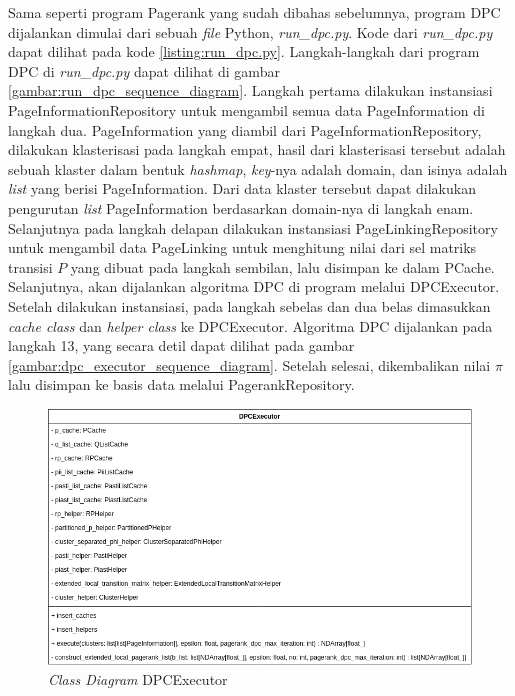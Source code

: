 Sama seperti program Pagerank yang sudah dibahas sebelumnya, program DPC dijalankan dimulai dari sebuah \textit{file} Python, \textit{run\_dpc.py}. Kode dari \textit{run\_dpc.py} dapat dilihat pada kode \ref{listing:run_dpc.py}. Langkah-langkah dari program DPC di \textit{run\_dpc.py} dapat dilihat di gambar \ref{gambar:run_dpc_sequence_diagram}. Langkah pertama dilakukan instansiasi PageInformationRepository untuk mengambil semua data PageInformation di langkah dua. PageInformation yang diambil dari PageInformationRepository, dilakukan klasterisasi pada langkah empat, hasil dari klasterisasi tersebut adalah sebuah klaster dalam bentuk \textit{hashmap}, \textit{key}-nya adalah domain, dan isinya adalah \textit{list} yang berisi PageInformation. Dari data klaster tersebut dapat dilakukan pengurutan \textit{list} PageInformation berdasarkan domain-nya di langkah enam. Selanjutnya pada langkah delapan dilakukan instansiasi PageLinkingRepository untuk mengambil data PageLinking untuk menghitung nilai dari sel matriks transisi $P$ yang dibuat pada langkah sembilan, lalu disimpan ke dalam PCache. Selanjutnya, akan dijalankan algoritma DPC di program melalui DPCExecutor. Setelah dilakukan instansiasi, pada langkah sebelas dan dua belas dimasukkan \textit{cache class} dan \textit{helper class} ke DPCExecutor. Algoritma DPC dijalankan pada langkah 13, yang secara detil dapat dilihat pada gambar \ref{gambar:dpc_executor_sequence_diagram}. Setelah selesai, dikembalikan nilai $\pi$ lalu disimpan ke basis data melalui PagerankRepository.

\begin{figure}[H]
	\centering
	\includegraphics[keepaspectratio, width={\textwidth}]{gambar/dpc_executor_class_diagram}
	\caption{\textit{Class Diagram} DPCExecutor}
	\label{gambar:dpc_executor_class_diagram}
\end{figure}

